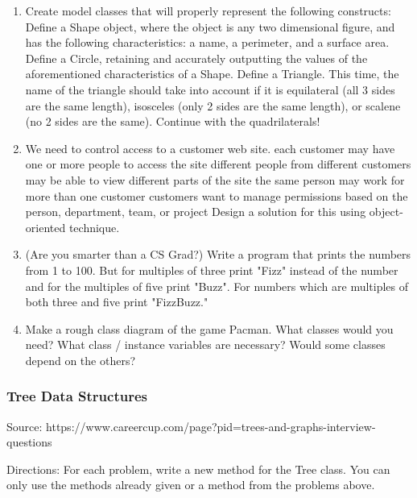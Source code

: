 \documentclass[11pt]{article}
\begin{document}
\begin{enumerate}
\def\labelenumi{\arabic{enumi}.}
\item
  Create model classes that will properly represent the following
  constructs: Define a Shape object, where the object is any two
  dimensional figure, and has the following characteristics: a name, a
  perimeter, and a surface area. Define a Circle, retaining and
  accurately outputting the values of the aforementioned characteristics
  of a Shape. Define a Triangle. This time, the name of the triangle
  should take into account if it is equilateral (all 3 sides are the
  same length), isosceles (only 2 sides are the same length), or scalene
  (no 2 sides are the same). Continue with the quadrilaterals!
\item
  We need to control access to a customer web site. each customer may
  have one or more people to access the site different people from
  different customers may be able to view different parts of the site
  the same person may work for more than one customer customers want to
  manage permissions based on the person, department, team, or project
  Design a solution for this using object-oriented technique.
\item
  (Are you smarter than a CS Grad?) Write a program that prints the
  numbers from 1 to 100. But for multiples of three print "Fizz" instead
  of the number and for the multiples of five print "Buzz". For numbers
  which are multiples of both three and five print "FizzBuzz."
\item
  Make a rough class diagram of the game Pacman. What classes would you
  need? What class / instance variables are necessary? Would some
  classes depend on the others?
\end{enumerate}

    \subsubsection{Tree Data Structures}\label{tree-data-structures}

Source:
https://www.careercup.com/page?pid=trees-and-graphs-interview-questions

Directions: For each problem, write a new method for the Tree class. You
can only use the methods already given or a method from the problems
above.
\end{document}
